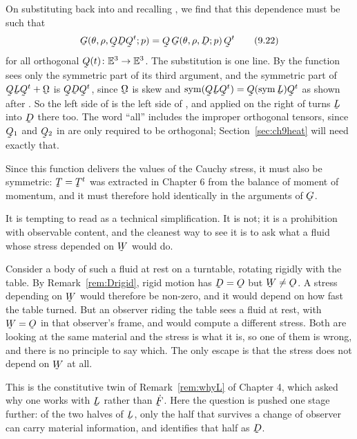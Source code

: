 On substituting back into  and recalling , we find
that this dependence must be such that
\begin{equation}
   \bG(\theta,\rho,\bQ\bD\bQ^{t};p)
   =\bQ\,\bG(\theta,\rho,\bD;p)\,\bQ^{t}
   \tag{9.22}\label{eq:9.22}
\end{equation}
for all orthogonal $\bQ(t)\colon\Vt\to\Vt$. The substitution is one
line. By  the function sees only the symmetric part of its
third argument, and the symmetric part of $\bQ\bL\bQ^{t}+\bOm$ is
$\bQ\bD\bQ^{t}$, since $\bOm$ is skew and
$\Sym(\bQ\bL\bQ^{t})=\bQ(\Sym\bL)\bQ^{t}$ as shown after . So
the left side of  is the left side of , and
 applied on the right of  turns $\bL$ into $\bD$
there too. The word ``all'' includes the improper orthogonal tensors,
since $\bQ_{1}$ and $\bQ_{2}$ in  are only required to be
orthogonal; Section~\ref{sec:ch9heat} will need exactly that.

Since this function delivers the values of the Cauchy stress, it must
also be symmetric: $\bT=\bT^{t}$ was extracted in Chapter 6 from the
balance of moment of momentum, and it must therefore hold identically in
the arguments of $\bG$.

\begin{remark}\label{rem:ch9noW}
It is tempting to read  as a technical simplification. It is
not; it is a prohibition with observable content, and the cleanest way
to see it is to ask what a fluid whose stress depended on $\bW$ would
do.

Consider a body of such a fluid at rest on a turntable, rotating rigidly
with the table. By Remark~\ref{rem:Drigid}, rigid motion has $\bD=\Ob$
but $\bW\neq\Ob$. A stress depending on $\bW$ would therefore be
non-zero, and it would depend on how fast the table turned. But an
observer riding the table sees a fluid at rest, with $\bW=\Ob$ in that
observer's frame, and would compute a different stress. Both are looking
at the same material and the stress is what it is, so one of them is
wrong, and there is no principle to say which. The only escape is that
the stress does not depend on $\bW$ at all.

This is the constitutive twin of Remark~\ref{rem:whyL} of Chapter 4,
which asked why one works with $\bL$ rather than $\dot\bF$. Here the
question is pushed one stage further: of the two halves of $\bL$, only
the half that survives a change of observer can carry material
information, and  identifies that half as $\bD$.
\end{remark}

